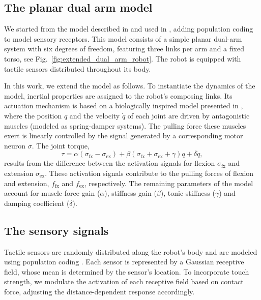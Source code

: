 \documentclass[letterpaper, 10 pt, conference]{ieeeconf}  %
\begin{document}
\subsection{The planar dual arm model}
We started from the model described in \cite{Mannella2018Knowyourbody} and used in \cite{Marcel2022Learningreachown}, adding population coding to model sensory receptors. This model consists of a simple planar dual-arm system with six degrees of freedom, featuring three links per arm and a fixed torso, see Fig.~\ref{fig:extended_dual_arm_robot}. The robot is equipped with tactile sensors distributed throughout its body. 

In this work, we extend the model as follows. 
To instantiate the dynamics of the model, inertial properties are assigned to the robot's composing links. Its actuation mechanism is based on a biologically inspired model presented in \cite{Shim2012Chaoticexplorationlearning}, where the position $q$ and the velocity $\dot{q}$ of each joint are driven by antagonistic muscles (modeled as spring-damper systems). The pulling force these muscles exert is linearly controlled by the signal generated by a corresponding motor neuron $\sigma$. The joint torque,
\begin{equation}\label{eq:antagonistic_torque}
	\tau = \alpha \left(\sigma_\mathrm{fx} - \sigma_\mathrm{ex}\right)  + \beta \left(\sigma_\mathrm{fx} + \sigma_\mathrm{ex} + \gamma \right) q + \delta \dot{q},
\end{equation}
results from the difference between the activation signals for flexion $ \sigma_\mathrm{fx} $ and extension $\sigma_\mathrm{ex}$. These activation signals contribute to the pulling forces of flexion and extension, $ f_\mathrm{fx}$ and $f_\mathrm{ex} $, respectively. The remaining parameters of the model account for muscle force gain ($\alpha$), stiffness gain ($\beta$), tonic stiffness ($\gamma$) and damping coefficient ($\delta$).

\subsection{The sensory signals}
Tactile sensors are randomly distributed along the robot's body and are modeled using population coding \cite{Panzeri2010PopulationCoding}. Each sensor is represented by a Gaussian receptive field, whose mean is determined by the sensor's location. To incorporate touch strength, we modulate the activation of each receptive field based on contact force, adjusting the distance-dependent response accordingly.  
\end{document}
